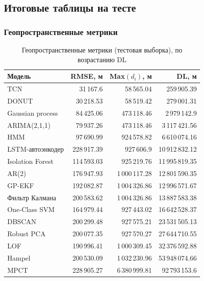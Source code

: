 \documentclass[a4paper,12pt]{report}
\begin{document}
\subsection{Итоговые таблицы на тесте}
\subsubsection{Геопространственные метрики}
\begin{table}[H]
\centering
\small
\caption{Геопространственные метрики (тестовая выборка), по возрастанию DL}
\begin{tabular}{lrrr}
\toprule
Модель & RMSE, м & Max$(d_i)$, м & DL, м \\
\midrule
TCN & 31\,167.6 & 58\,565.04 & 259\,905.39 \\
DONUT & 30\,218.53 & 58\,519.42 & 279\,001.31 \\
Gaussian process & 84\,425.06 & 473\,118.46 & 2\,979\,142.9 \\
ARIMA(2,1,1) & 79\,937.26 & 473\,118.46 & 3\,117\,421.56 \\
HMM & 97\,690.99 & 924\,578.82 & 6\,610\,074.16 \\
LSTM-автоэнкодер & 228\,917.39 & 927\,606.9 & 10\,912\,832.12 \\
Isolation Forest & 114\,593.03 & 925\,219.76 & 11\,995\,819.35 \\
AR(2) & 176\,947.93 & 1\,000\,117.28 & 12\,801\,590.35 \\
GP-EKF & 192\,082.87 & 1\,004\,326.86 & 12\,996\,571.67 \\
Фильтр Калмана & 200\,583.62 & 1\,004\,326.86 & 13\,887\,583.38 \\
One-Class SVM & 164\,979.44 & 927\,443.02 & 16\,642\,528.37 \\
DBSCAN & 200\,299.48 & 927\,575.21 & 23\,531\,505.13 \\
Robust PCA & 200\,077.35 & 927\,570.27 & 27\,644\,710.55 \\
LOF & 190\,996.41 & 1\,000\,309.45 & 32\,376\,592.88 \\
Hampel & 200\,530.09 & 1\,032\,230.96 & 53\,948\,074.66 \\
MPCT & 228\,905.27 & 6\,380\,999.81 & 92\,793\,153.6 \\
\bottomrule
\end{tabular}
\end{table}
\end{document}
